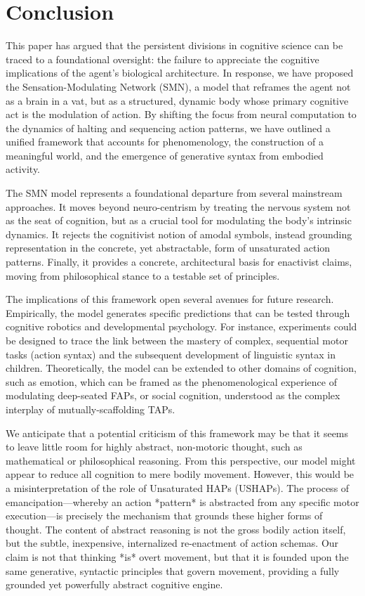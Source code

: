 \section{Conclusion}
This paper has argued that the persistent divisions in cognitive science can be traced to a foundational oversight: the failure to appreciate the cognitive implications of the agent's biological architecture. In response, we have proposed the Sensation-Modulating Network (SMN), a model that reframes the agent not as a brain in a vat, but as a structured, dynamic body whose primary cognitive act is the modulation of action. By shifting the focus from neural computation to the dynamics of halting and sequencing action patterns, we have outlined a unified framework that accounts for phenomenology, the construction of a meaningful world, and the emergence of generative syntax from embodied activity.

The SMN model represents a foundational departure from several mainstream approaches. It moves beyond neuro-centrism by treating the nervous system not as the seat of cognition, but as a crucial tool for modulating the body's intrinsic dynamics. It rejects the cognitivist notion of amodal symbols, instead grounding representation in the concrete, yet abstractable, form of unsaturated action patterns. Finally, it provides a concrete, architectural basis for enactivist claims, moving from philosophical stance to a testable set of principles.

The implications of this framework open several avenues for future research. Empirically, the model generates specific predictions that can be tested through cognitive robotics and developmental psychology. For instance, experiments could be designed to trace the link between the mastery of complex, sequential motor tasks (action syntax) and the subsequent development of linguistic syntax in children. Theoretically, the model can be extended to other domains of cognition, such as emotion, which can be framed as the phenomenological experience of modulating deep-seated FAPs, or social cognition, understood as the complex interplay of mutually-scaffolding TAPs.

We anticipate that a potential criticism of this framework may be that it seems to leave little room for highly abstract, non-motoric thought, such as mathematical or philosophical reasoning. From this perspective, our model might appear to reduce all cognition to mere bodily movement. However, this would be a misinterpretation of the role of Unsaturated HAPs (USHAPs). The process of emancipation—whereby an action *pattern* is abstracted from any specific motor execution—is precisely the mechanism that grounds these higher forms of thought. The content of abstract reasoning is not the gross bodily action itself, but the subtle, inexpensive, internalized re-enactment of action schemas. Our claim is not that thinking *is* overt movement, but that it is founded upon the same generative, syntactic principles that govern movement, providing a fully grounded yet powerfully abstract cognitive engine.

